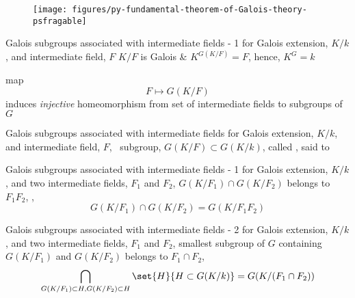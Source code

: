 \documentclass[17pt,landscape]{foils}
\begin{document}
{\begin{figure}
\begin{center}
	\texttt{[image: figures/py-fundamental-theorem-of-Galois-theory-psfragable]}
	\label{fig:diagrams for Galois main result}
\end{center}
\end{figure}
\vspace{-.5em}



\begin{mytheorem}{Galois subgroups associated with intermediate fields - 1}
	for Galois extension, $K/k$,
	and intermediate field, $F$
	\shrinkspacewithintheoremslike
	\ibit
	\iitem
		$K/F$ is Galois \& $K^{G(K/F)} = F$, hence, $K^G = k$

	\iitem
		map
		$$
			F \mapsto G(K/F)
		$$
		induces \emph{injective} homeomorphism
		from set of intermediate fields
		to subgroups of $G$
	\eit
	\shrinkspacewithintheoremslike
\end{mytheorem}

\begin{mydefinition}{Galois subgroups associated with intermediate fields}
	for Galois extension, $K/k$, and intermediate field, $F$,\ %
	subgroup, $G(K/F)\subset G(K/k)$,
	called ,
	said to 
\end{mydefinition}

\begin{mycorollary}{Galois subgroups associated with intermediate fields - 1}
	for Galois extension, $K/k$,
	and
	two intermediate fields, $F_1$ and $F_2$,
%
	$G(K/F_1) \cap G(K/F_2)$ belongs to $F_1F_2$,
	\ie,
	$$
		G(K/F_1) \cap G(K/F_2)
		= G(K/F_1F_2)
	$$
\end{mycorollary}

\begin{mycorollary}{Galois subgroups associated with intermediate fields - 2}
	for Galois extension, $K/k$,
	and
	two intermediate fields, $F_1$ and $F_2$,
%
	smallest subgroup of $G$ containing $G(K/F_1)$ and $G(K/F_2)$
	belongs to
	$F_1\cap F_2$,\
	\ie
	$$
		\bigcap_{G(K/F_1)\subset H, G(K/F_2)\subset H} \set{H}{H\subset G(K/k)}
		=
		G(K/(F_1\cap F_2))
	$$
\end{mycorollary}

}
\end{document}
